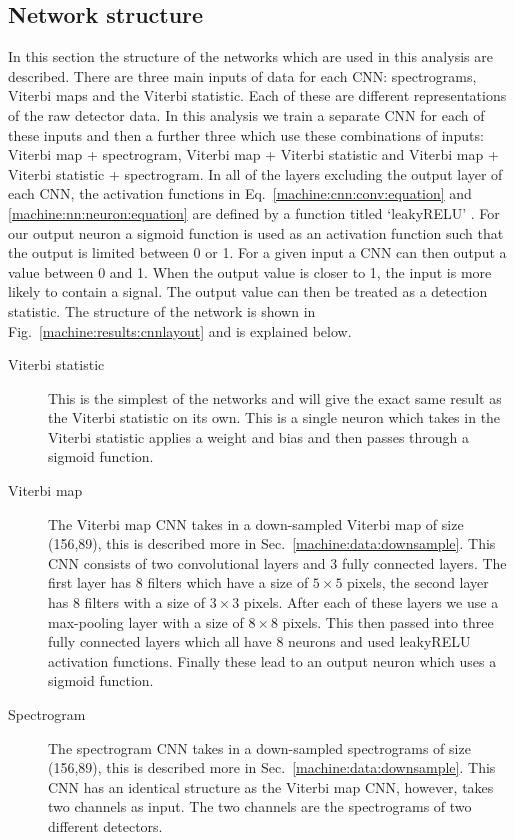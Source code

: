 \subsection{\label{machine:cw:structure}Network structure}

In this section the structure of the networks which are used in this analysis
are described. There are three main inputs of data for each \gls{CNN}: spectrograms, Viterbi maps and the Viterbi statistic. Each of these are different representations of the raw detector data. In this analysis we train a separate \gls{CNN} for each of
these inputs and then a further three which use these combinations of inputs:
Viterbi map + spectrogram, Viterbi map + Viterbi statistic and Viterbi map +
Viterbi statistic + spectrogram. In all of the layers excluding the output layer of each \gls{CNN}, the activation functions in Eq.~\ref{machine:cnn:conv:equation} and \ref{machine:nn:neuron:equation} are defined by a function titled `leakyRELU' \cite{maas2013RectifierNonlinearities}. 
For our output neuron a sigmoid function is
used as an activation function such that the output is limited between 0 or 1.
For a given input a \gls{CNN} can then output a value between 0 and 1. When the output value is closer to 1, the input is more likely to contain a signal. 
The output value can then be treated as a detection statistic. 
The structure of the network is shown in Fig.~\ref{machine:results:cnnlayout} and is explained below. 

\begin{description}
	\item [Viterbi statistic] This is the simplest of the networks and will
	give the exact same result as the Viterbi statistic on its own. This is a
	single neuron which takes in the Viterbi statistic applies a weight and bias
	and then passes through a sigmoid function.
	
	\item [Viterbi map] The Viterbi map \gls{CNN} takes in a down-sampled Viterbi map of size (156,89), this is described more in Sec.~\ref{machine:data:downsample}.
	This \gls{CNN} consists of two convolutional layers and 3 fully connected layers. The first layer has
	8 filters which have a size of $5\times5$ pixels, the second layer has 8
	filters with a size of $3\times3$ pixels. After each of these layers we use a
	max-pooling layer with a size of $8\times8$ pixels. This then passed into three
	fully connected layers which all have 8 neurons and used leakyRELU activation
	functions. Finally these lead to an output neuron which uses a sigmoid
	function.
	
	\item [Spectrogram] The spectrogram \gls{CNN} takes in a down-sampled spectrograms of size (156,89), this is described more in Sec.~\ref{machine:data:downsample}.
	This \gls{CNN} has an identical structure as the Viterbi map \gls{CNN}, however, takes two channels as input. The two channels are the spectrograms of two different detectors.
	
\end{description}


